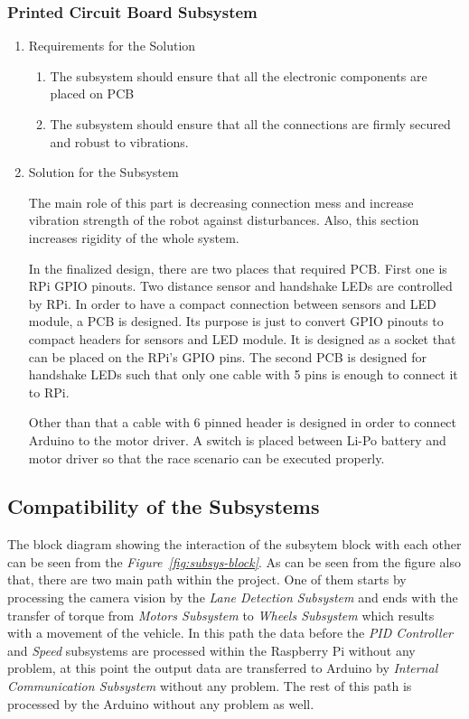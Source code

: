 \documentclass[a4paper,12pt]{article}
\begin{document}
\subsubsection{Printed Circuit Board Subsystem}
	\begin{enumerate}
		\item {Requirements for the Solution}
		
		\begin{enumerate}
			\item The subsystem should ensure that all the electronic components are placed on PCB
			\item The subsystem should ensure that all the connections are firmly secured and robust to vibrations.
		\end{enumerate} 

	\item {Solution for the Subsystem}

		The main role of this part is decreasing connection mess and increase vibration strength of the robot against disturbances. Also, this section increases rigidity of the whole system. 
		
		In the finalized design, there are two places that required PCB. First one is RPi GPIO pinouts. Two distance sensor and handshake LEDs are controlled by RPi. In order to have a compact connection between sensors and LED module, a PCB is designed. Its purpose is just to convert GPIO pinouts to compact headers for sensors and LED module. It is designed as a socket that can be placed on the RPi's GPIO pins. The second PCB is designed for handshake LEDs such that only one cable with 5 pins is enough to connect it to RPi.  
		
		Other than that a cable with 6 pinned header is designed in order to connect Arduino to the motor driver. A switch is placed between Li-Po battery and motor driver so that the race scenario can be executed properly.




	\end{enumerate}	




\subsection{Compatibility of the Subsystems}
	The block diagram showing the interaction of the subsytem block with each other can be seen from the \textit{Figure~\ref{fig:subsys-block}}. As can be seen from the figure also that, there are two main path within the project. One of them starts by processing the camera vision by the \textit{Lane Detection Subsystem} and ends with the transfer of torque from \textit{Motors Subsystem} to \textit{Wheels Subsystem} which results with a movement of the vehicle. In this path the data before the \textit{PID Controller} and \textit{Speed} subsystems are processed within the Raspberry Pi without any problem, at this point the output data are transferred to Arduino by \textit{Internal Communication Subsystem} without any problem. The rest of this path is processed by the Arduino without any problem as well.
\end{document}
